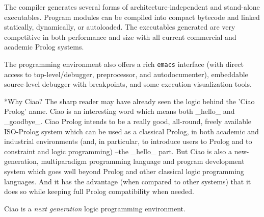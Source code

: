 \documentclass{article}
\makeatletter
\def\subsection{\@startsection{subsection}{2}{\z@}{-1.0ex plus -1ex minus 
 -.2ex}{0.7ex plus .2ex}{\normalsize\bf}}
\makeatother
\begin{document}
The compiler generates several forms of architecture-independent and
stand-alone executables. Program modules can be compiled into compact
bytecode and linked statically, dynamically, or autoloaded. The
executables generated are very competitive in both performance and
size with all current commercial and academic Prolog systems.

The programming environment also offers a rich \texttt{emacs}
interface (with direct access to top-level/debugger, preprocessor,
and autodocumenter), embeddable source-level debugger with
breakpoints, and some execution visualization tools. 

\subsection*{Why Ciao?}
The sharp reader may have already seen
the logic behind the 'Ciao Prolog' name. Ciao is an interesting
word which means both \_hello\_ and \_goodbye\_. Ciao Prolog intends to
be a really good, all-round, freely available ISO-Prolog system
which can be used as a classical Prolog, in both academic and
industrial environments (and, in particular, to introduce users to
Prolog and to constraint and logic programming) --the \_hello\_ part.
But Ciao is also a new-generation, multiparadigm programming
language and program development system which goes well beyond
Prolog and other classical logic programming languages. And it has
the advantage (when compared to other systems) that it does so
while keeping full Prolog compatibility when needed.

Ciao is a \emph{next generation} logic programming environment.
\end{document}
